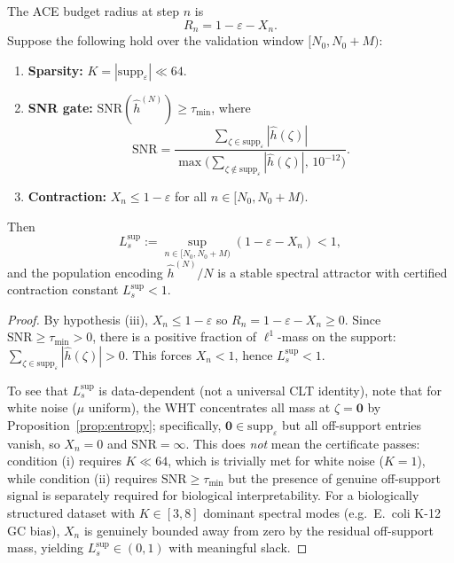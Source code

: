 \documentclass[11pt]{article}
\begin{document}
\begin{theorem}\label{thm:C6}
The ACE budget radius at step $n$ is
\[
  R_n = 1 - \varepsilon - X_n.
\]
Suppose the following hold over the validation window
$[N_0, N_0 + M)$:
\begin{enumerate}[nosep,label=(\roman*)]
  \item \textbf{Sparsity:} $K = |\mathrm{supp}_\varepsilon| \ll 64$.
  \item \textbf{SNR gate:} $\mathrm{SNR}(\hat{h}^{(N)}) \ge \tau_{\min}$, where
        \[
          \mathrm{SNR}
          = \frac{\sum_{\zeta \in \mathrm{supp}_\varepsilon}|\hat{h}(\zeta)|}
                 {\max\!\bigl(\sum_{\zeta \notin \mathrm{supp}_\varepsilon}|\hat{h}(\zeta)|,\,10^{-12}\bigr)}.
        \]
  \item \textbf{Contraction:} $X_n \le 1 - \varepsilon$ for all
        $n \in [N_0, N_0+M)$.
\end{enumerate}
Then
\[
  L_s^{\sup}
  := \sup_{n \in [N_0,N_0+M)}\!(1 - \varepsilon - X_n) < 1,
\]
and the population encoding $\hat{h}^{(N)}/N$ is a stable spectral
attractor with certified contraction constant $L_s^{\sup} < 1$.
\end{theorem}

\begin{proof}
By hypothesis (iii), $X_n \le 1 - \varepsilon$ so $R_n = 1-\varepsilon-X_n \ge 0$.
Since $\mathrm{SNR} \ge \tau_{\min} > 0$, there is a positive fraction of
$\ell^1$-mass on the support:
$\sum_{\zeta \in \mathrm{supp}_\varepsilon}|\hat{h}(\zeta)| > 0$.
This forces $X_n < 1$, hence $L_s^{\sup} < 1$.

To see that $L_s^{\sup}$ is data-dependent (not a universal CLT identity),
note that for white noise ($\mu$ uniform), the WHT concentrates all mass
at $\zeta = \bm{0}$ by Proposition~\ref{prop:entropy}; specifically,
$\bm{0} \in \mathrm{supp}_\varepsilon$ but all off-support entries vanish,
so $X_n = 0$ and $\mathrm{SNR} = \infty$.  This does \emph{not} mean
the certificate passes: condition (i) requires $K \ll 64$, which is
trivially met for white noise ($K=1$), while condition (ii) requires
$\mathrm{SNR} \ge \tau_{\min}$ but the presence of genuine off-support
signal is separately required for biological interpretability.
For a biologically structured dataset with $K \in [3,8]$
dominant spectral modes (e.g.\ E.\ coli K-12 GC bias), $X_n$ is
genuinely bounded away from zero by the residual off-support mass,
yielding $L_s^{\sup} \in (0,1)$ with meaningful slack.
\end{proof}
\end{document}
